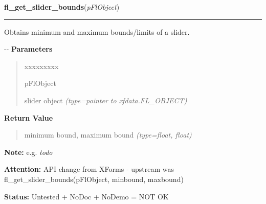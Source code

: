 \hspace{.8\funcindent}\begin{boxedminipage}{\funcwidth}

    \raggedright \textbf{fl\_get\_slider\_bounds}(\textit{pFlObject})

    \vspace{-1.5ex}

    \rule{\textwidth}{0.5\fboxrule}
\setlength{\parskip}{2ex}

Obtains minimum and maximum bounds/limits of a slider.

-{}-
\setlength{\parskip}{1ex}
      \textbf{Parameters}
      \vspace{-1ex}

      \begin{quote}
        \begin{Ventry}{xxxxxxxxx}

          \item[pFlObject]


slider object
            {\it (type=pointer to xfdata.FL\_OBJECT)}

        \end{Ventry}

      \end{quote}

      \textbf{Return Value}
    \vspace{-1ex}

      \begin{quote}

minimum bound, maximum bound
      {\it (type=float, float)}

      \end{quote}

\textbf{Note:} 
e.g. \emph{todo}


\textbf{Attention:} 
API change from XForms - upstream was
fl\_get\_slider\_bounds(pFlObject, minbound, maxbound)


\textbf{Status:} 
Untested + NoDoc + NoDemo = NOT OK


    \end{boxedminipage}

    \label{xformslib:flslider:fl_set_slider_step}

    \vspace{0.5ex}

